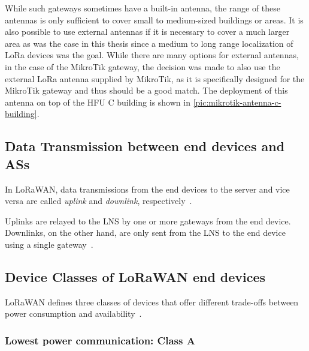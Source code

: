 While such gateways sometimes have a built-in antenna, the range of these antennas is only sufficient to cover small to medium-sized buildings or areas.
It is also possible to use external antennas if it is necessary to cover a much larger area as was the case in this thesis since a medium to long range localization of \ac{LoRa} devices was the goal.
While there are many options for external antennas, in the case of the MikroTik gateway, the decision was made to also use the external \ac{LoRa} antenna supplied by MikroTik, as it is specifically designed for the MikroTik gateway and thus should be a good match.
The deployment of this antenna on top of the \ac{HFU} C building is shown in \cref{pic:mikrotik-antenna-c-building}.

\subsection{Data Transmission between end devices and \aclp{AS}}

In LoRaWAN, data transmissions from the end devices to the server and vice versa are called \emph{uplink} and \emph{downlink}, respectively~\cite[p. 12]{lora_alliance_inc_lorawan_specification_2017}.

Uplinks are relayed to the \ac{LNS} by one or more gateways from the end device.
Downlinks, on the other hand, are only sent from the \ac{LNS} to the end device using a single gateway~\cite[p. 12]{lora_alliance_inc_lorawan_specification_2017}.

\subsection{Device Classes of \acs{LoRaWAN} end devices}\label{sec:device-classes}

\ac{LoRaWAN} defines three classes of devices that offer different trade-offs between power consumption and availability~\cite[p. 10]{lora_alliance_inc_lorawan_specification_2017}.

\subsubsection{Lowest power communication: Class A}

